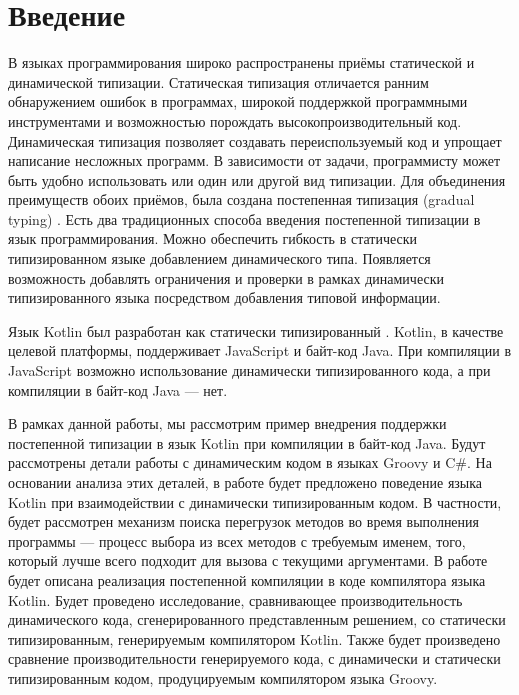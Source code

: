 \section*{Введение}

В языках программирования широко распространены приёмы статической и динамической типизации. Статическая типизация отличается ранним обнаружением ошибок в программах, широкой поддержкой программными инструментами и возможностью порождать высокопроизводительный код. Динамическая типизация позволяет создавать переиспользуемый код и упрощает написание несложных программ. 
В зависимости от задачи, программисту может быть удобно использовать или один или другой вид типизации. Для объединения преимуществ обоих приёмов, была создана постепенная типизация (gradual typing) \cite{gradual:siek2006gradual}. Есть два традиционных способа введения постепенной типизации в язык программирования. Можно обеспечить гибкость в статически типизированном языке добавлением динамического типа. Появляется возможность добавлять ограничения и проверки в рамках динамически типизированного языка посредством добавления типовой информации.

Язык Kotlin был разработан как статически типизированный . 
Kotlin, в качестве целевой платформы, поддерживает JavaScript и байт-код Java. При компиляции в JavaScript возможно использование динамически типизированного кода, а при компиляции в байт-код Java --- нет.

В рамках данной работы, мы рассмотрим пример внедрения поддержки постепенной типизации в язык Kotlin при компиляции в байт-код Java. Будут рассмотрены детали работы с динамическим кодом в языках Groovy и C\#. На основании анализа этих деталей, в работе будет предложено поведение языка Kotlin при взаимодействии с динамически типизированным кодом. В частности, будет рассмотрен механизм поиска перегрузок методов во время выполнения программы --- процесс выбора из всех методов с требуемым именем, того, который лучше всего подходит для вызова с текущими аргументами. В работе будет описана реализация постепенной компиляции в коде компилятора языка Kotlin. Будет проведено исследование, сравнивающее производительность динамического кода, сгенерированного представленным решением, со статически типизированным, генерируемым компилятором Kotlin. Также будет произведено сравнение производительности генерируемого кода, с динамически и статически типизированным кодом, продуцируемым компилятором языка Groovy. 



